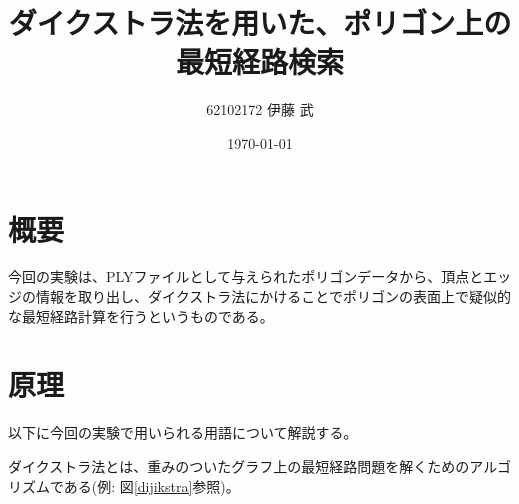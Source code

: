 \documentclass[a4paper,11pt]{jsarticle}
\begin{document}
\title{ダイクストラ法を用いた、ポリゴン上の最短経路検索}
\author{62102172 伊藤 武}
\date{\today}
\maketitle




\section{概要}
今回の実験は、PLYファイルとして与えられたポリゴンデータから、頂点とエッジの情報を取り出し、ダイクストラ法にかけることでポリゴンの表面上で疑似的な最短経路計算を行うというものである。

\section{原理}

以下に今回の実験で用いられる用語について解説する。

ダイクストラ法とは、重みのついたグラフ上の最短経路問題を解くためのアルゴリズムである(例: 図\ref{dijikstra}参照)。
\end{document}
